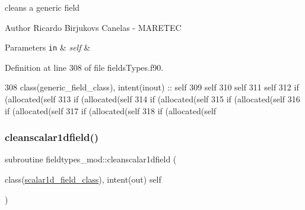 cleans a generic field 

\begin{DoxyAuthor}{Author}
Ricardo Birjukovs Canelas -\/ M\+A\+R\+E\+T\+EC 
\end{DoxyAuthor}

\begin{DoxyParams}[1]{Parameters}
\mbox{\tt in}  & {\em self} & \\
\hline
\end{DoxyParams}


Definition at line 308 of file fields\+Types.\+f90.


\begin{DoxyCode}
308     \textcolor{keywordtype}{class}(generic\_field\_class), \textcolor{keywordtype}{intent(inout)} :: self
309     self%
310     self%
311     self%
312     \textcolor{keywordflow}{if} (\textcolor{keyword}{allocated}(self%
313     \textcolor{keywordflow}{if} (\textcolor{keyword}{allocated}(self%
314     \textcolor{keywordflow}{if} (\textcolor{keyword}{allocated}(self%
315     \textcolor{keywordflow}{if} (\textcolor{keyword}{allocated}(self%
316     \textcolor{keywordflow}{if} (\textcolor{keyword}{allocated}(self%
317     \textcolor{keywordflow}{if} (\textcolor{keyword}{allocated}(self%
318     \textcolor{keywordflow}{if} (\textcolor{keyword}{allocated}(self%
\end{DoxyCode}
\mbox{\label{namespacefieldtypes__mod_aeb05bd1de9be296711016ad5b607a091}} 
\subsubsection{\texorpdfstring{cleanscalar1dfield()}{cleanscalar1dfield()}}
{\footnotesize\ttfamily subroutine fieldtypes\+\_\+mod\+::cleanscalar1dfield (\begin{DoxyParamCaption}\item[{class(\mbox{\hyperlink{structfieldtypes__mod_1_1scalar1d__field__class}{scalar1d\+\_\+field\+\_\+class}}), intent(out)}]{self }\end{DoxyParamCaption})\hspace{0.3cm}{\ttfamily [private]}}



